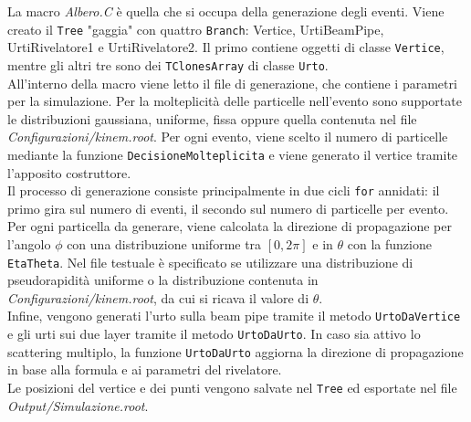 \documentclass[11pt,a4paper]{article}
\begin{document}
\par La macro \textit{Albero.C} è quella che si occupa della generazione degli eventi. Viene creato il \lstinline{Tree} "gaggia" con quattro \lstinline{Branch}: Vertice, UrtiBeamPipe, UrtiRivelatore1 e UrtiRivelatore2. Il primo contiene oggetti di classe \lstinline{Vertice}, mentre gli altri tre sono dei \lstinline{TClonesArray} di classe \lstinline{Urto}.\\
All'interno della macro viene letto il file di generazione, che contiene i parametri per la simulazione. Per la molteplicità delle particelle nell'evento sono supportate le distribuzioni gaussiana, uniforme, fissa oppure quella contenuta nel file \textit{Configurazioni/kinem.root}. Per ogni evento, viene scelto il numero di particelle mediante la funzione \lstinline{DecisioneMolteplicita} e viene generato il vertice tramite l'apposito costruttore.\\
Il processo di generazione consiste principalmente in due cicli \lstinline{for} annidati: il primo gira sul numero di eventi, il secondo sul numero di particelle per evento.\\
Per ogni particella da generare, viene calcolata la direzione di propagazione per l'angolo $\phi$ con una distribuzione uniforme tra $[0, 2\pi]$ e in $\theta$ con la funzione \lstinline{EtaTheta}. Nel file testuale è specificato se utilizzare una distribuzione di pseudorapidità uniforme o la distribuzione contenuta in \textit{Configurazioni/kinem.root}, da cui si ricava il valore di $\theta$.\\
Infine, vengono generati l'urto sulla beam pipe tramite il metodo \lstinline{UrtoDaVertice} e gli urti sui due layer tramite il metodo \lstinline{UrtoDaUrto}. In caso sia attivo lo scattering multiplo, la funzione \lstinline{UrtoDaUrto} aggiorna la direzione di propagazione in base alla formula e ai parametri del rivelatore.\\
Le posizioni del vertice e dei punti vengono salvate nel \lstinline{Tree} ed esportate nel file \textit{Output/Simulazione.root}.\\
\end{document}
